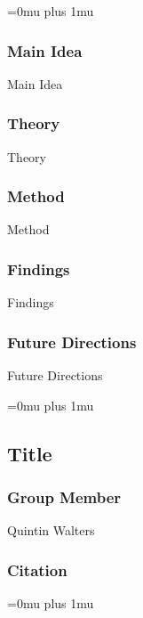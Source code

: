 \Urlmuskip=0mu plus 1mu\relax

\subsubsection{Main Idea}

\noindent
Main Idea

\subsubsection{Theory}

\noindent
Theory

\subsubsection{Method}

\noindent
Method

\subsubsection{Findings}

\noindent
Findings

\subsubsection{Future Directions}

\noindent
Future Directions 

\Urlmuskip=0mu plus 1mu\relax

\noindent
\subsection{Title}

\subsubsection{Group Member}

\noindent
Quintin Walters

\noindent
\subsubsection{Citation}

\Urlmuskip=0mu plus 1mu\relax

